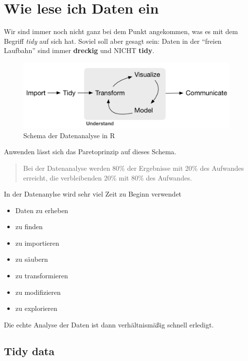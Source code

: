 \documentclass[
]{article}
\providecommand{\tightlist}{%
  \setlength{\itemsep}{0pt}\setlength{\parskip}{0pt}}
\begin{document}
\hypertarget{wie-lese-ich-daten-ein}{%
\section{Wie lese ich Daten ein}\label{wie-lese-ich-daten-ein}}

Wir sind immer noch nicht ganz bei dem Punkt angekommen, was es mit dem Begriff \emph{tidy} auf sich hat. Soviel soll aber gesagt sein: Daten in der ``freien Laufbahn'' sind immer \textbf{dreckig} und NICHT \textbf{tidy}.

\begin{figure}

{\centering \includegraphics[width=18.53in]{images/001} 

}

\caption{Schema der Datenanalyse in R}\label{fig:unnamed-chunk-101}
\end{figure}

Anwenden lässt sich das Paretoprinzip auf dieses Schema.

\begin{quote}
Bei der Datenanalyse werden 80\% der Ergebnisse mit 20\% des Aufwandes erreicht, die verbleibenden 20\% mit 80\% des Aufwandes.
\end{quote}

In der Datenanylse wird sehr viel Zeit zu Beginn verwendet

\begin{itemize}
\tightlist
\item
  Daten zu erheben
\item
  zu finden
\item
  zu importieren
\item
  zu säubern
\item
  zu transformieren
\item
  zu modifizieren
\item
  zu explorieren
\end{itemize}

Die echte Analyse der Daten ist dann verhältnismäßig schnell erledigt.

\hypertarget{tidy-data}{%
\subsection{Tidy data}\label{tidy-data}}
\end{document}
